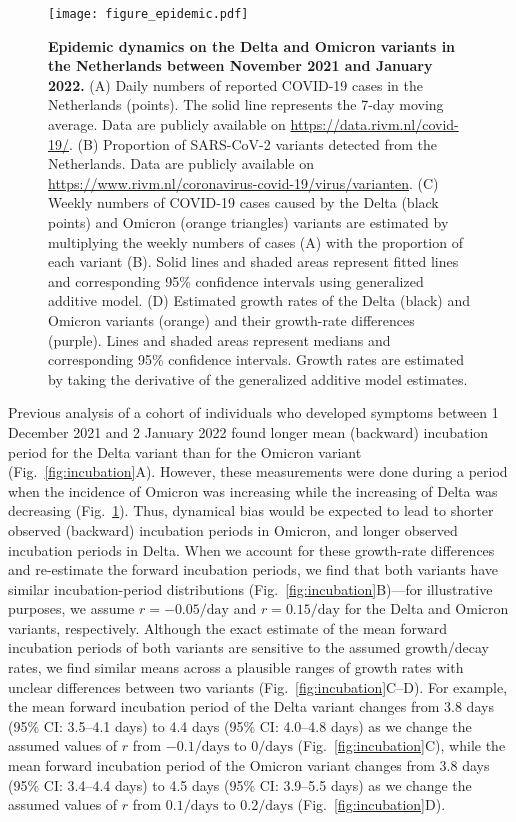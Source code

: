 \documentclass[12pt]{article}
\newcommand{\comment}{\showcomment}
\newcommand{\showcomment}[3]{\textcolor{#1}{\textbf{[#2: }\textsl{#3}\textbf{]}}}
\newcommand{\jd}[1]{\comment{cyan}{JD}{#1}}
\newcommand{\swp}[1]{\comment{magenta}{SWP}{#1}}
\newcommand{\fref}[1]{Fig.~\ref{fig:#1}}
\begin{document}
\begin{figure}[!ht]
\texttt{[image: figure\_epidemic.pdf]}
\caption{
\textbf{Epidemic dynamics on the Delta and Omicron variants in the Netherlands between November 2021 and January 2022.}
(A) Daily numbers of reported COVID-19 cases in the Netherlands (points).
The solid line represents the 7-day moving average.
Data are publicly available on \url{https://data.rivm.nl/covid-19/}.
(B) Proportion of SARS-CoV-2 variants detected from the Netherlands. Data are publicly available on \url{https://www.rivm.nl/coronavirus-covid-19/virus/varianten}.
(C) Weekly numbers of COVID-19 cases caused by the Delta (black points) and Omicron (orange triangles) variants are estimated by multiplying the weekly numbers of cases (A) with the proportion of each variant (B).
Solid lines and shaded areas represent fitted lines and corresponding 95\% confidence intervals using generalized additive model.
(D) Estimated growth rates of the Delta (black) and Omicron variants (orange) and their growth-rate differences (purple).
Lines and shaded areas represent medians and corresponding 95\% confidence intervals.
Growth rates are estimated by taking the derivative of the generalized additive model estimates.
\label{fig:epidemic}
}
\end{figure}

Previous analysis of a cohort of individuals who developed symptoms between 1 December 2021 and 2 January 2022 found longer mean (backward) incubation period for the Delta variant than for the Omicron variant \citep{backer2021omicron} (\fref{incubation}A).
However, these measurements were done during a period when the incidence of Omicron was increasing while the increasing of Delta was decreasing (\fref{epidemic}).
Thus, dynamical bias would be expected to lead to shorter observed (backward) incubation periods in Omicron, and longer observed incubation periods in Delta. 
When we account for these growth-rate differences and re-estimate the forward incubation periods, we find that both variants have similar incubation-period distributions (\fref{incubation}B)---for illustrative purposes, we assume $r=-0.05/\mathrm{day}$ and $r=0.15/\mathrm{day}$ for the Delta and Omicron variants, respectively.
Although the exact estimate of the mean forward incubation periods of both variants are sensitive to the assumed growth/decay rates, we find similar means across a plausible ranges of growth rates with unclear differences between two variants (\fref{incubation}C--D).
For example, the mean forward incubation period of the Delta variant changes from 3.8 days (95\% CI: 3.5--4.1 days) to 4.4 days (95\% CI: 4.0--4.8 days) as we change the assumed values of $r$ from $-0.1/\mathrm{days}$ to $0/\mathrm{days}$ (\fref{incubation}C), while
the mean forward incubation period of the Omicron variant changes from 3.8 days (95\% CI: 3.4--4.4 days) to 4.5 days (95\% CI: 3.9--5.5 days) as we change the assumed values of $r$ from $0.1/\mathrm{days}$ to $0.2/\mathrm{days}$ (\fref{incubation}D).
\end{document}
